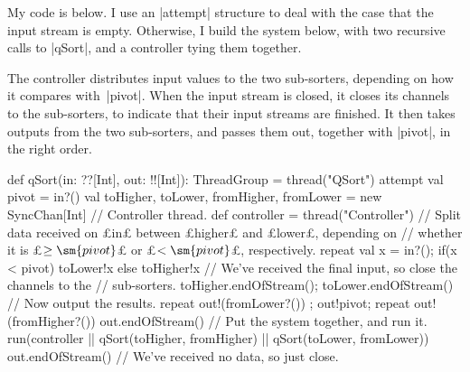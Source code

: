 \begin{answerS}
My code is below.  I use an |attempt| structure to deal with the case that the
input stream is empty.  Otherwise, I build the system below, with two
recursive calls to |qSort|, and a controller tying them together.
%
\begin{center}
\end{center}
%
The controller distributes input values to the two sub-sorters, depending on
how it compares with~|pivot|.  When the input stream is closed, it closes its
channels to the sub-sorters, to indicate that their input streams are
finished.  It then takes outputs from the two sub-sorters, and passes them
out, together with |pivot|, in the right order.
%
\begin{scala}
  def qSort(in: ??[Int], out: !![Int]): ThreadGroup = thread("QSort"){
    attempt{
      val pivot = in?()
      val toHigher, toLower, fromHigher, fromLower = new SyncChan[Int]
      // Controller thread.
      def controller = thread("Controller"){
	// Split data received on £in£ between £higher£ and £lower£, depending on
	// whether it is £$\ge \sm{pivot}$£ or £$< \sm{pivot}$£, respectively.
	repeat{ val x = in?(); if(x < pivot) toLower!x else toHigher!x }
	// We've received the final input, so close the channels to the
	// sub-sorters.
	toHigher.endOfStream(); toLower.endOfStream()
	// Now output the results.
	repeat{ out!(fromLower?()) }; out!pivot; repeat{ out!(fromHigher?()) }
	out.endOfStream()
      }      
      // Put the system together, and run it.
      run(controller || qSort(toHigher, fromHigher) || qSort(toLower, fromLower))
    }{ out.endOfStream() } // We've received no data, so just close.
  }
\end{scala}
\end{answerS}
